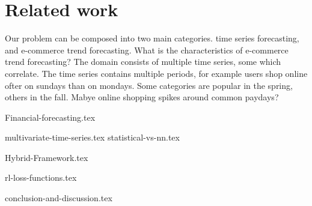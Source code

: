 
\chapter{Related work}\label{RelatedWorkMain}
Our problem can be composed into two main categories.
time series forecasting, and e-commerce trend forecasting.
What is the characteristics of e-commerce trend forecasting?
The domain consists of multiple time series, some which correlate.
The time series contains multiple periods, for example users shop
online ofter on sundays than on mondays. 
Some categories are popular in the spring, others in the fall.
Mabye online shopping spikes around common paydays?



{Financial-forecasting.tex}

{multivariate-time-series.tex}
{statistical-vs-nn.tex}

{Hybrid-Framework.tex}

{rl-loss-functions.tex}

{conclusion-and-discussion.tex}